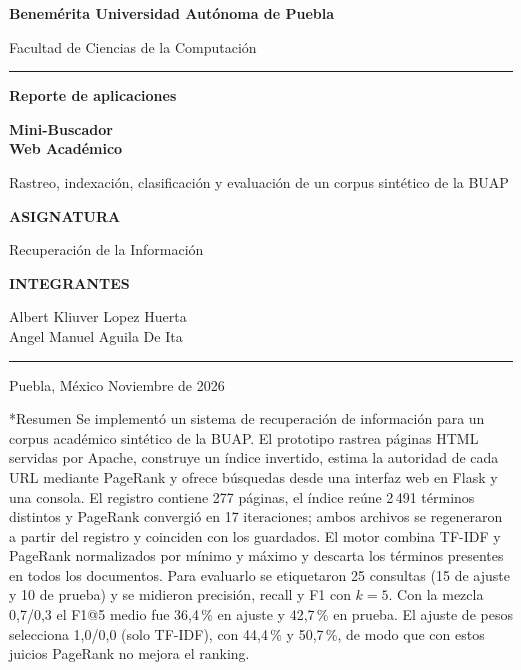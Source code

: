 \documentclass[11pt,letterpaper]{article}
\makeatletter
\renewcommand{\section}{\@startsection{section}{1}{0pt}{-2.2ex plus -.5ex}{1.1ex}{\Large\sffamily\bfseries\color{navy}}}
\makeatother
\begin{document}
	\hypersetup{pageanchor=false}
	\begin{titlepage}
		\color{navy}\sffamily
		\vspace*{12mm}
		{\Large\bfseries Benemérita Universidad Autónoma de Puebla\par}
		\vspace{2mm}
		{\large Facultad de Ciencias de la Computación\par}
		\vspace{7mm}
		{\color{teal}\rule{\linewidth}{1.4pt}\par}
		\vspace{24mm}
		{\large\color{teal}\bfseries Reporte de aplicaciones\par}
		\vspace{5mm}
		{\fontsize{35}{39}\selectfont\bfseries Mini-Buscador\\ Web Académico\par}
		\vspace{6mm}
		{\Large Rastreo, indexación, clasificación y evaluación de un corpus sintético de la BUAP\par}
		\vfill
		{\small\color{teal}\bfseries ASIGNATURA\par}
		{\large Recuperación de la Información\par}
		\vspace{6mm}
		{\small\color{teal}\bfseries INTEGRANTES\par}
		{\large Albert Kliuver Lopez Huerta\\ Angel Manuel Aguila De Ita\par}
		\vfill
		{\color{teal}\rule{\linewidth}{0.65pt}\par}
		{\small Puebla, México \hfill Noviembre de 2026\par}
	\end{titlepage}
	\hypersetup{pageanchor=true}
	\section*{Resumen}
	Se implementó un sistema de recuperación de información para un corpus académico sintético de la BUAP. El prototipo rastrea páginas HTML servidas por Apache, construye un índice invertido, estima la autoridad de cada URL mediante PageRank y ofrece búsquedas desde una interfaz web en Flask y una consola. El registro contiene 277 páginas, el índice reúne 2\,491 términos distintos y PageRank convergió en 17 iteraciones; ambos archivos se regeneraron a partir del registro y coinciden con los guardados. El motor combina TF-IDF y PageRank normalizados por mínimo y máximo y descarta los términos presentes en todos los documentos. Para evaluarlo se etiquetaron 25 consultas (15 de ajuste y 10 de prueba) y se midieron precisión, recall y F1 con $k=5$. Con la mezcla 0,7/0,3 el F1@5 medio fue 36,4\,\% en ajuste y 42,7\,\% en prueba. El ajuste de pesos selecciona 1,0/0,0 (solo TF-IDF), con 44,4\,\% y 50,7\,\%, de modo que con estos juicios PageRank no mejora el ranking.
	
\end{document}
